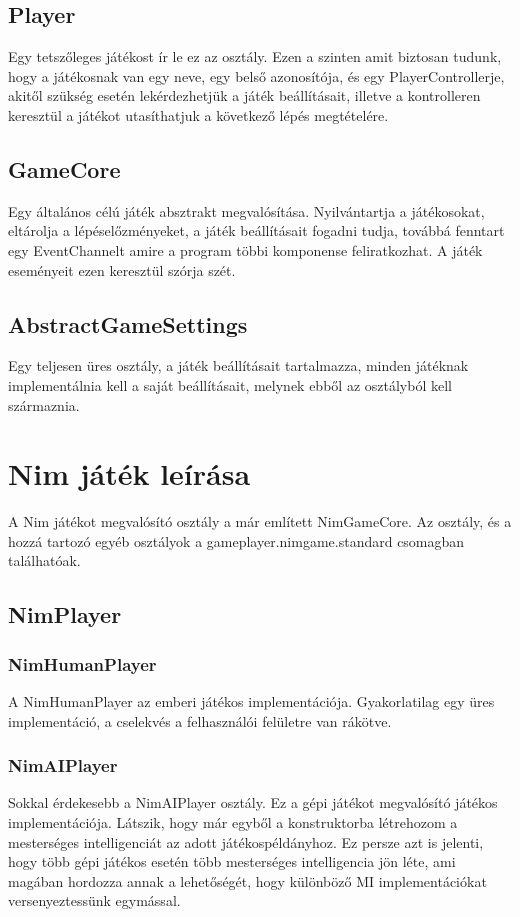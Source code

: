 \subsection{Player}
Egy tetszőleges játékost ír le ez az osztály. Ezen a szinten amit biztosan tudunk, hogy a játékosnak van egy neve, egy belső azonosítója, és egy PlayerControllerje, akitől szükség esetén lekérdezhetjük a játék beállításait, illetve a kontrolleren keresztül a játékot utasíthatjuk a következő lépés megtételére.

\subsection{GameCore}
Egy általános célú játék absztrakt megvalósítása. Nyilvántartja a játékosokat, eltárolja a lépéselőzményeket, a játék beállításait fogadni tudja, továbbá fenntart egy EventChannelt amire a program többi komponense feliratkozhat. A játék eseményeit ezen keresztül szórja szét.

\subsection{AbstractGameSettings}
Egy teljesen üres osztály, a játék beállításait tartalmazza, minden játéknak implementálnia kell a saját beállításait, melynek ebből az osztályból kell származnia.

\section{Nim játék leírása}
A Nim játékot megvalósító osztály a már említett NimGameCore. Az osztály, és a hozzá tartozó egyéb osztályok a gameplayer.nimgame.standard csomagban találhatóak.

\subsection{NimPlayer}

\subsubsection{NimHumanPlayer}
A NimHumanPlayer az emberi játékos implementációja. Gyakorlatilag egy üres implementáció, a cselekvés a felhasználói felületre van rákötve.

\subsubsection{NimAIPlayer}
Sokkal érdekesebb a NimAIPlayer osztály. Ez a gépi játékot megvalósító játékos implementációja. Látszik, hogy már egyből a konstruktorba létrehozom a mesterséges intelligenciát az adott játékospéldányhoz. Ez persze azt is jelenti, hogy több gépi játékos esetén több mesterséges intelligencia jön léte, ami magában hordozza annak a lehetőségét, hogy különböző MI implementációkat versenyeztessünk egymással.\ujsor

